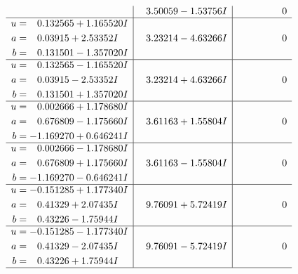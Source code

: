 \documentclass[1p]{elsarticle_modified}
\theoremstyle{definition}
\begin{document}
$$\begin{array}{c|c|c}
 & \phantom{-}3.50059 - 1.53756 I & \phantom{-0.000000 } 0 \\ \hline\begin{aligned}
u &= \phantom{-}0.132565 + 1.165520 I \\
a &= \phantom{-}0.03915 + 2.53352 I \\
b &= \phantom{-}0.131501 - 1.357020 I\end{aligned}
 & \phantom{-}3.23214 - 4.63266 I & \phantom{-0.000000 } 0 \\ \hline\begin{aligned}
u &= \phantom{-}0.132565 - 1.165520 I \\
a &= \phantom{-}0.03915 - 2.53352 I \\
b &= \phantom{-}0.131501 + 1.357020 I\end{aligned}
 & \phantom{-}3.23214 + 4.63266 I & \phantom{-0.000000 } 0 \\ \hline\begin{aligned}
u &= \phantom{-}0.002666 + 1.178680 I \\
a &= \phantom{-}0.676809 - 1.175660 I \\
b &= -1.169270 + 0.646241 I\end{aligned}
 & \phantom{-}3.61163 + 1.55804 I & \phantom{-0.000000 } 0 \\ \hline\begin{aligned}
u &= \phantom{-}0.002666 - 1.178680 I \\
a &= \phantom{-}0.676809 + 1.175660 I \\
b &= -1.169270 - 0.646241 I\end{aligned}
 & \phantom{-}3.61163 - 1.55804 I & \phantom{-0.000000 } 0 \\ \hline\begin{aligned}
u &= -0.151285 + 1.177340 I \\
a &= \phantom{-}0.41329 + 2.07435 I \\
b &= \phantom{-}0.43226 - 1.75944 I\end{aligned}
 & \phantom{-}9.76091 + 5.72419 I & \phantom{-0.000000 } 0 \\ \hline\begin{aligned}
u &= -0.151285 - 1.177340 I \\
a &= \phantom{-}0.41329 - 2.07435 I \\
b &= \phantom{-}0.43226 + 1.75944 I\end{aligned}
 & \phantom{-}9.76091 - 5.72419 I & \phantom{-0.000000 } 0\\
 \hline 
 \end{array}$$\newpage$$\begin{array}{c|c|c}  

\end{array}$$
\end{document}
